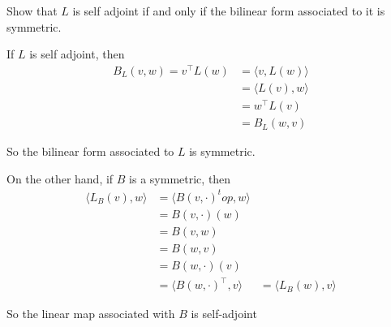 \documentclass{ximera}
\begin{document}
	Show that $L$ is self adjoint if and only if the bilinear form associated to it is symmetric.
\begin{free-response}
	If $L$ is self adjoint, then 
	\begin{align*}
	B_L(v,w) = v^\top L(w) &= \langle v , L(w)\rangle\\
		&= \langle L(v), w \rangle\\
		&= w^\top L(v)\\
		&=B_L(w,v)
	\end{align*}
	
	So the bilinear form associated to $L$ is symmetric. 
	
	 On the other hand, if $B$ is a symmetric, then
		\begin{align*}
		\langle L_B(v) , w \rangle &= \langle  B(v,\cdot)^top, w\rangle\\
			&= B(v,\cdot)(w)\\
			&=B(v,w)\\
			&=B(w,v)\\
			&=B(w,\cdot)(v)\\
			&=\langle B(w,\cdot)^\top , v \rangle
			&=\langle L_B(w), v\rangle
		\end{align*}
		
		So the linear map associated with $B$ is self-adjoint
\end{free-response}
\end{document}
